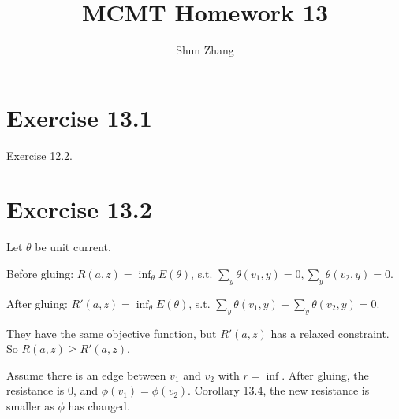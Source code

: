 \documentclass[10pt]{article}
\title{MCMT Homework 13}
\author{Shun Zhang}
\date{}
\begin{document}
\maketitle

\section*{Exercise 13.1}

Exercise 12.2.

\section*{Exercise 13.2}

Let $\theta$ be unit current.

Before gluing: $R(a, z) = \inf_\theta E(\theta)$,
s.t. $\sum_y \theta(v_1, y) = 0, \sum_y \theta(v_2, y) = 0$.

After gluing:  $R'(a, z) = \inf_\theta E(\theta)$,
s.t. $\sum_y \theta(v_1, y) + \sum_y \theta(v_2, y) = 0$.

They have the same objective function, but $R'(a, z)$ has a relaxed constraint.
So $R(a, z) \geq R'(a, z)$.

\hfill

Assume there is an edge between $v_1$ and $v_2$ with $r = \inf$. After gluing,
the resistance is $0$, and $\phi(v_1) = \phi(v_2)$.  Corollary 13.4, the new
resistance is smaller as $\phi$ has changed.
\end{document}
